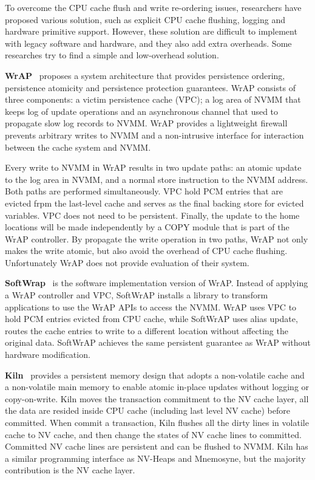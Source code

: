 To overcome the CPU cache flush and write re-ordering issues, researchers
have proposed various solution, such as explicit CPU cache flushing, logging
and hardware primitive support. However, these solution are difficult
to implement with legacy software and hardware, and they also add extra
overheads. Some researches try to find a simple and low-overhead solution.

\textbf{WrAP}~\cite{WrAP} proposes a system architecture
 that provides persistence
ordering, persistence atomicity and persistence protection guarantees. 
WrAP consists of three components: a victim persistence cache (VPC); a log
area of NVMM that keeps log of update operations and an asynchronous channel
that used to propagate slow log records to NVMM. WrAP provides a lightweight
firewall prevents arbitrary writes to NVMM and a non-intrusive interface
for interaction between the cache system and NVMM.

Every write to NVMM in WrAP results in two update paths: an atomic update to
the log area in NVMM, and a normal store instruction to the NVMM address. Both
paths are performed simultaneously. VPC hold PCM entries that are evicted
frpm the last-level cache and serves as the final backing store for evicted
variables. VPC does not need to be persistent.
Finally, the update to the home locations will be made
independently by a COPY module that is part of the WrAP controller. 
By propagate the write operation in two paths, WrAP not only makes the 
write atomic, but also avoid the overhead of CPU cache flushing.
Unfortunately WrAP does not provide evaluation of their system.

\textbf{SoftWrap}~\cite{softWrAP}
 is the software implementation version of WrAP.
Instead of applying a WrAP controller and VPC, SoftWrAP installs a library
to transform applications to use the WrAP APIs to access the NVMM. WrAP
uses VPC to hold PCM entries evicted from CPU cache, while SoftWrAP
uses alias update, routes the cache entries to write to a different location
without affecting the original data. SoftWrAP achieves the same persistent
guarantee as WrAP without hardware modification.

\textbf{Kiln}~\cite{Kiln} provides a persistent memory design
 that adopts a non-volatile
cache and a non-volatile main memory to enable atomic in-place updates without
logging or copy-on-write. Kiln moves the transaction commitment to the NV
cache layer, all the data are resided inside CPU cache (including last level
NV cache) before committed. When commit a transaction, Kiln flushes all
the dirty lines in volatile cache to NV cache, and then change the states of
NV cache lines to committed. Committed NV cache lines are persistent and
can be flushed to NVMM. Kiln has a similar programming interface as NV-Heaps
and Mnemosyne, but the majority contribution is the NV cache layer.

